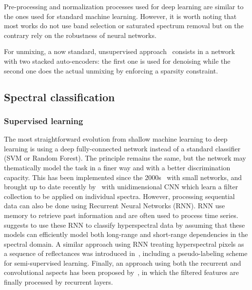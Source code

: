 \documentclass[journal]{IEEEtran}
\begin{document}
Pre-processing and normalization processes used for deep learning are similar to the ones used for standard machine learning. However, it is worth noting that most works do not use band selection or saturated spectrum removal but on the contrary rely on the robustness of neural networks.

For unmixing, a now standard, unsupervised  approach~\cite{Guo2015HyperspectralIU,ozkan17endnet} consists in a network with two stacked auto-encoders: the first one is used for denoising while the second one does the actual unmixing by enforcing a sparsity constraint.



\subsection{Spectral classification}

\subsubsection{Supervised learning} The most straightforward evolution from shallow machine learning to deep learning is using a deep fully-connected network instead of a standard classifier (SVM or Random Forest). The principle remains the same, but the network may thematically model the task in a finer way and with a better discrimination capacity. This has been implemented since the 2000s~\cite{goel_classification_2003,ratle_semisupervised_2010} with small networks, and brought up to date recently by~\cite{hu_deep_2015} with unidimensional CNN which learn a filter collection to be applied on individual spectra. However, processing sequential data can also be done using Recurrent Neural Networks (RNN). RNN use memory to retrieve past information and are often used to process time series. \cite{mou_deep_2017} suggests to use these RNN to classify hyperspectral data by assuming that these models can efficiently model both long-range and short-range dependencies in the spectral domain. A similar approach using RNN treating hyperspectral pixels as a sequence of reflectances was introduced in~\cite{wu_semi-supervised_2018}, including a pseudo-labeling scheme for semi-supervised learning. Finally, an approach using both the recurrent and convolutional aspects has been proposed by~\cite{wu_convolutional_2017}, in which the filtered features are finally processed by recurrent layers.
\end{document}
